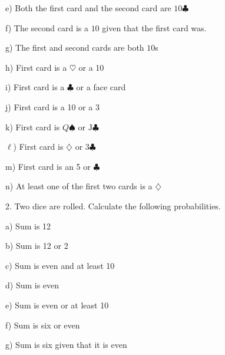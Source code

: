 \documentclass[10pt]{article}
\begin{document}
\hspace{20pt} e) Both the first card and the second card are  $10\clubsuit$
\bigskip\medskip

\hspace{20pt} f) The second card is a $10$ given that the first card was.
\bigskip\medskip

\hspace{20pt} g) The first and second cards are both $10$s
\bigskip\medskip

\hspace{20pt} h) First card is a $\heartsuit$ or a 10
\bigskip\medskip

\hspace{20pt} i) First card is a $\clubsuit$ or a face card
\bigskip\medskip

\hspace{20pt} j) First card is a 10 or a 3
\bigskip\medskip

\hspace{20pt} k) First card is $Q\spadesuit$ or $\mbox{J}\clubsuit$
\bigskip\medskip

\hspace{20pt} $\ell$) First card is $\diamondsuit$ or $\mbox{3}\clubsuit$
\bigskip\medskip

\hspace{20pt} m) First card is an 5 or $\clubsuit$
\bigskip\medskip

\hspace{20pt} n) At least one of the first two cards is a $\diamondsuit$
\bigskip\medskip

2. Two dice are rolled. Calculate the following probabilities.
\medskip

\hspace{20pt} a) Sum is 12
\bigskip\medskip

\hspace{20pt} b) Sum is 12 or 2
\bigskip\medskip

\hspace{20pt} c) Sum is even and at least 10
\bigskip\medskip

\hspace{20pt} d) Sum is even
\bigskip\medskip

\hspace{20pt} e) Sum is even or at least 10
\bigskip\medskip

\hspace{20pt} f) Sum is six or even
\bigskip\medskip

\hspace{20pt} g) Sum is six given that it is even
\bigskip\medskip
\end{document}
